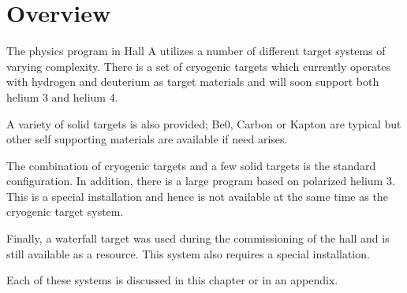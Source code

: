 \section{ Overview}

The physics program in Hall A utilizes a number of different
target systems of varying complexity. There is a set of
cryogenic targets which currently operates with hydrogen and deuterium
as target materials and will soon support both helium 3 and
helium 4.

A variety of solid targets is also provided; Be0, Carbon or
Kapton are typical but other self supporting materials are available if need arises.

The combination of cryogenic targets and a few solid targets is
the standard configuration. In addition,
there is a large program based on polarized helium 3. This
is a special installation and hence is not available at the same
time as the cryogenic target system.

Finally, a waterfall target was used during the commissioning of
the hall and is still available as a resource. This system
also requires a special installation.

Each of these systems is discussed in this chapter or in an appendix.
%
